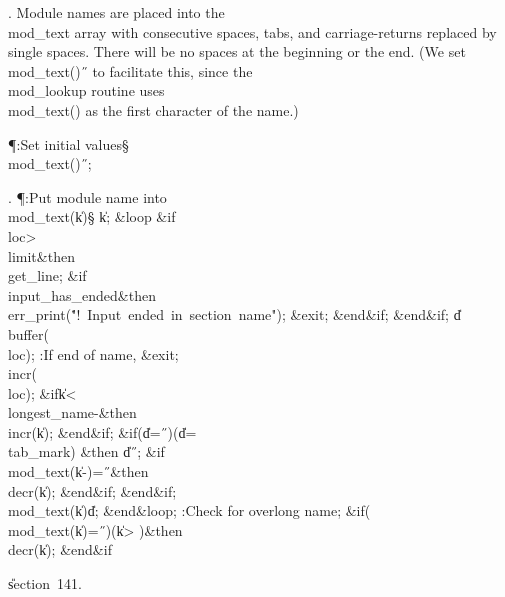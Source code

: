 . Module names are placed into the \\{mod\_text} array with consecutive
spaces,
tabs, and carriage-returns replaced by single spaces. There will be no
spaces at the beginning or the end. (We set \\{mod\_text}\?(\?)\K\?\H{\ } to
facilitate
this, since the \\{mod\_lookup} routine uses \\{mod\_text}\?(\?)\? as the
first
character of the name.)

\Y\P\?\4:Set initial values\X\mathrel{+}\S\?\6
\\{mod\_text}\?\1(\?\2)\K\?\H{\ };\par
\fi

. \P\?:Put module name into \\{mod\_text}\?(\?\to\?\|k\?)\?\X\S\?\6
\|k\?\K{};\6
\1\&{loop}\6
\&{if}\1\1\8\\{loc}\?>\?\\{limit}\2\8\&{then}\6
\\{get\_line};\6
\&{if}\1\1\8\\{input\_has\_ended}\2\8\&{then}\6
\\{err\_print}\?\1(\?\.{"!\ Input\ ended\ in\ section\ name"}\?\2)\?;\6
\&{exit};\2\6
\&{end}\8\2\&{if}\1;\2\6
\&{end}\8\2\&{if}\1;\6
\|d\?\K\?\\{buffer}\?\1(\?\\{loc}\?\2)\?;\5
:If end of name, \&{exit}\X;\6
\\{incr}\?\1(\?\\{loc}\?\2)\?;\6
\&{if}\1\1\8\|k\?<\?\\{longest\_name}\?-\2\8\&{then}\6
\\{incr}\?\1(\?\|k\?\2)\?;\2\6
\&{end}\8\2\&{if}\1;\6
\&{if}\1\1\?\8\1(\?\|d\?=\?\H{\ }\?\2)\V\1(\?\|d\?=\?\\{tab\_mark}\?\2)\?\2\8%
\&{then}\6
\|d\?\K\?\H{\ };\6
\&{if}\1\1\8\\{mod\_text}\?\1(\?\|k\?-\?\2)=\?\H{\ }\2\8\&{then}\6
\\{decr}\?\1(\?\|k\?\2)\?;\2\6
\&{end}\8\2\&{if}\1;\2\6
\&{end}\8\2\&{if}\1;\6
\\{mod\_text}\?\1(\?\|k\?\2)\K\?\|d;\2\6
\&{end}\8\&{loop};\6
:Check for overlong name\X;\6
\&{if}\1\1\?\8\1(\?\\{mod\_text}\?\1(\?\|k\?\2)=\?\H{\ }\?\2)\W\1(\?\|k\?>\?%
\2)\?\2\8\&{then}\6
\\{decr}\?\1(\?\|k\?\2)\?;\2\6
\&{end}\8\2\&{if}\1\par
\U section~141.\fi

